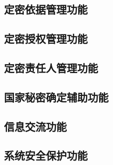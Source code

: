 \subsection{定密依据管理功能}

\subsection{定密授权管理功能}

\subsection{定密责任人管理功能}

\subsection{国家秘密确定辅助功能}

\subsection{信息交流功能}

\subsection{系统安全保护功能}